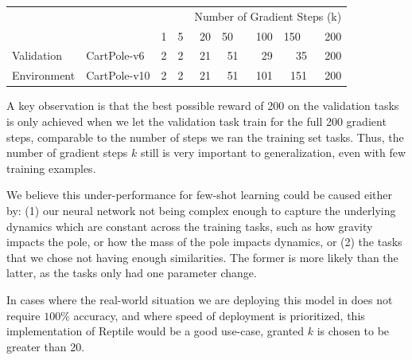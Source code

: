 \documentclass[runningheads]{llncs}
\begin{document}
\begin{table}[h]
\centering
\begin{tabular}{lllllllll}
 &  &  &  & \multicolumn{5}{l}{Number of Gradient Steps (k)}  \\ \cline{3-9} 
 &
  \multicolumn{1}{l|}{} &
  \multicolumn{1}{l|}{1} &
  \multicolumn{1}{l|}{5} &
  \multicolumn{1}{r|}{20} &
  \multicolumn{1}{l|}{50} &
  \multicolumn{1}{r|}{100} &
  \multicolumn{1}{l|}{150} &
  \multicolumn{1}{r|}{200} \\ \cline{2-9} 
\multicolumn{1}{l|}{Validation} &
  \multicolumn{1}{l|}{CartPole-v6} &
  \multicolumn{1}{l|}{2} &
  \multicolumn{1}{l|}{2} &
  \multicolumn{1}{r|}{21} &
  \multicolumn{1}{r|}{51} &
  \multicolumn{1}{r|}{29} &
  \multicolumn{1}{r|}{35} &
  \multicolumn{1}{r|}{200} \\ \cline{2-9} 
\multicolumn{1}{l|}{Environment} &
  \multicolumn{1}{l|}{CartPole-v10} &
  \multicolumn{1}{l|}{2} &
  \multicolumn{1}{l|}{2} &
  \multicolumn{1}{r|}{21} &
  \multicolumn{1}{r|}{51} &
  \multicolumn{1}{r|}{101} &
  \multicolumn{1}{r|}{151} &
  \multicolumn{1}{r|}{200} \\ \cline{2-9} 
\end{tabular}
\end{table}

\noindent A key observation is that the best possible reward of 200 on the validation tasks is only achieved when we let the validation task train for the full 200 gradient steps, comparable to the number of steps we ran the training set tasks. Thus, the number of gradient steps $k$ still is very important to generalization, even with few training examples. 

We believe this under-performance for few-shot learning could be caused either by: (1) our neural network not being complex enough to capture the underlying dynamics which are constant across the training tasks, such as how gravity impacts the pole, or how the mass of the pole impacts dynamics, or (2) the tasks that we chose not having enough similarities. The former is more likely than the latter, as the tasks only had one parameter change.

In cases where the real-world situation we are deploying this model in does not require $100\%$ accuracy, and where speed of deployment is prioritized, this implementation of Reptile would be a good use-case, granted $k$ is chosen to be greater than 20.
\end{document}
